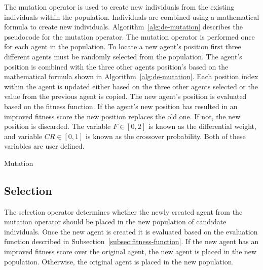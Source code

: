 The mutation operator is used to create new individuals from the existing individuals within the population. Individuals are combined using a mathematical formula to create new individuals. Algorithm~\ref{alg:de-mutation} describes the pseudocode for the mutation operator. The mutation operator is performed once for each agent in the population. To locate a new agent's position first three different agents must be randomly selected from the population. The agent's position is combined with the three other agents position's based on the mathematical formula shown in Algorithm~\ref{alg:de-mutation}. Each position index within the agent is updated either based on the three other agents selected or the value from the previous agent is copied. The new agent's position is evaluated based on the fitness function. If the agent's new position has resulted in an improved fitness score the new position replaces the old one. If not, the new position is discarded. The variable $F \in [0,2]$ is known as the differential weight, and variable $CR \in [0,1]$ is known as the crossover probability. Both of these variables are user defined.

\begin{algorithm}
	\caption{Mutation}
	\label{alg:de-mutation}
	\begin{algorithmic}

				\ELSE
				\ENDIF
			\ENDFOR
			\ENDIF
		\ENDFOR

	\end{algorithmic}
\end{algorithm}

\subsection{Selection}
\label{subsec:de-selection}

The selection operator determines whether the newly created agent from the mutation operator should be placed in the new population of candidate individuals. Once the new agent is created it is evaluated based on the evaluation function described in Subsection~\ref{subsec:fitness-function}. If the new agent has an improved fitness score over the original agent, the new agent is placed in the new population. Otherwise, the original agent is placed in the new population.
